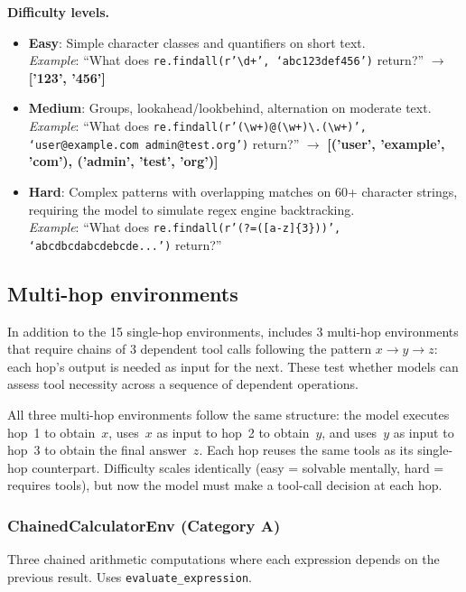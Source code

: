 \textbf{Difficulty levels.}
\begin{itemize}
    \item \textbf{Easy}: Simple character classes and quantifiers on short text.\\
    \emph{Example}: ``What does \texttt{re.findall(r'\textbackslash d+', `abc123def456')} return?'' $\to$ \textbf{['123', '456']}
    \item \textbf{Medium}: Groups, lookahead/lookbehind, alternation on moderate text.\\
    \emph{Example}: ``What does \texttt{re.findall(r'(\textbackslash w+)@(\textbackslash w+)\textbackslash.(\textbackslash w+)', `user@example.com admin@test.org')} return?'' $\to$ \textbf{[('user', 'example', 'com'), ('admin', 'test', 'org')]}
    \item \textbf{Hard}: Complex patterns with overlapping matches on 60+ character strings, requiring the model to simulate regex engine backtracking.\\
    \emph{Example}: ``What does \texttt{re.findall(r'(?=([a-z]\{3\}))', `abcdbcdabcdebcde...')} return?''
\end{itemize}

\subsection{Multi-hop environments}

In addition to the 15 single-hop environments, \benchmark{} includes 3 multi-hop environments that require chains of 3 dependent tool calls following the pattern $x \to y \to z$: each hop's output is needed as input for the next. These test whether models can assess tool necessity across a sequence of dependent operations.

All three multi-hop environments follow the same structure: the model executes hop~1 to obtain~$x$, uses~$x$ as input to hop~2 to obtain~$y$, and uses~$y$ as input to hop~3 to obtain the final answer~$z$. Each hop reuses the same tools as its single-hop counterpart. Difficulty scales identically (easy = solvable mentally, hard = requires tools), but now the model must make a tool-call decision at each hop.

\subsubsection{ChainedCalculatorEnv (Category A)}

Three chained arithmetic computations where each expression depends on the previous result. Uses \texttt{evaluate\_expression}.

